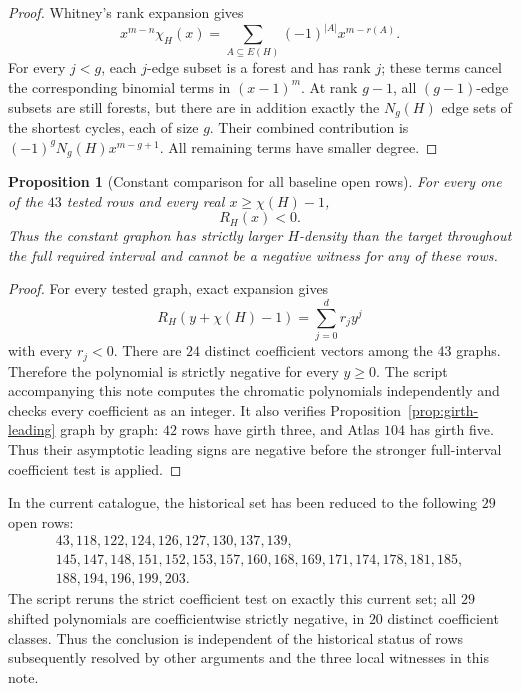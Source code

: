 \documentclass[11pt]{article}
\newtheorem{proposition}[theorem]{Proposition}
\begin{document}
\begin{proof}
Whitney's rank expansion gives
\[
 x^{m-n}\chi_H(x)
 =\sum_{A\subseteq E(H)}(-1)^{|A|}x^{m-r(A)}.
\]
For every $j<g$, each $j$-edge subset is a forest and has rank $j$; these
terms cancel the corresponding binomial terms in $(x-1)^m$.  At rank
$g-1$, all $(g-1)$-edge subsets are still forests, but there are in addition
exactly the $N_g(H)$ edge sets of the shortest cycles, each of size $g$.
Their combined contribution is $(-1)^gN_g(H)x^{m-g+1}$.  All remaining
terms have smaller degree.
\end{proof}

\begin{proposition}[Constant comparison for all baseline open rows]
For every one of the $43$ tested rows and every real
$x\geq\chi(H)-1$,
\[
 R_H(x)<0.
\]
Thus the constant graphon has strictly larger $H$-density than the target
throughout the full required interval and cannot be a negative witness for
any of these rows.
\end{proposition}

\begin{proof}
For every tested graph, exact expansion gives
\[
 R_H(y+\chi(H)-1)=\sum_{j=0}^{d}r_jy^j
\]
with every $r_j<0$.  There are $24$ distinct coefficient vectors among the
$43$ graphs.  Therefore the polynomial is strictly negative for every
$y\geq0$.  The script accompanying this note computes the chromatic
polynomials independently and checks every coefficient as an integer.  It
also verifies Proposition~\ref{prop:girth-leading} graph by graph: $42$ rows
have girth three, and Atlas $104$ has girth five.  Thus their asymptotic
leading signs are negative before the stronger full-interval coefficient
test is applied.
\end{proof}

In the current catalogue, the historical set has been reduced to the
following $29$ open rows:
\[
\begin{gathered}
43,118,122,124,126,127,130,137,139,\\
145,147,148,151,152,153,157,160,168,169,171,174,178,181,185,\\
188,194,196,199,203.
\end{gathered}
\]
The script reruns the strict coefficient test on exactly this current set;
all $29$ shifted polynomials are coefficientwise strictly negative, in $20$
distinct coefficient classes.  Thus the conclusion is independent of the
historical status of rows subsequently resolved by other arguments and the
three local witnesses in this note.
\end{document}
